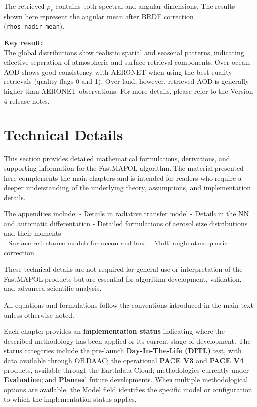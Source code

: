 \documentclass[
  11pt,
  letterpaper,
]{scrreprt}
\begin{document}
The retrieved \(\rho_s\) contains both spectral and angular dimensions.
The results shown here represent the angular mean after BRDF correction
(\texttt{rhos\_nadir\_mean}).

\textbf{Key result:}\\
The global distributions show realistic spatial and seasonal patterns,
indicating effective separation of atmospheric and surface retrieval
components. Over ocean, AOD shows good consistency with AERONET when
using the best-quality retrievals (quality flags 0 and 1). Over land,
however, retrieved AOD is generally higher than AERONET observations.
For more details, please refer to the Version 4 release notes.

\cleardoublepage
{}
{}
\appendix

\chapter{Technical Details}\label{technical-details-1}

This section provides detailed mathematical formulations, derivations,
and supporting information for the FastMAPOL algorithm. The material
presented here complements the main chapters and is intended for readers
who require a deeper understanding of the underlying theory,
assumptions, and implementation details.

The appendices include: - Details in radiative transfer model - Details
in the NN and automatic differentation - Detailed formulations of
aerosol size distributions and their moments\\
- Surface reflectance models for ocean and land - Multi-angle
atmospheric correction

These technical details are not required for general use or
interpretation of the FastMAPOL products but are essential for algorithm
development, validation, and advanced scientific analysis.

All equations and formulations follow the conventions introduced in the
main text unless otherwise noted.

Each chapter provides an \textbf{implementation status} indicating where
the described methodology has been applied or its current stage of
development. The status categories include the pre-launch
\textbf{Day-In-The-Life (DITL)} test, with data available through
OB.DAAC; the operational \textbf{PACE V3} and \textbf{PACE V4} products,
available through the Earthdata Cloud; methodologies currently under
\textbf{Evaluation}; and \textbf{Planned} future developments. When
multiple methodological options are available, the Model field
identifies the specific model or configuration to which the
implementation status applies.
\end{document}
